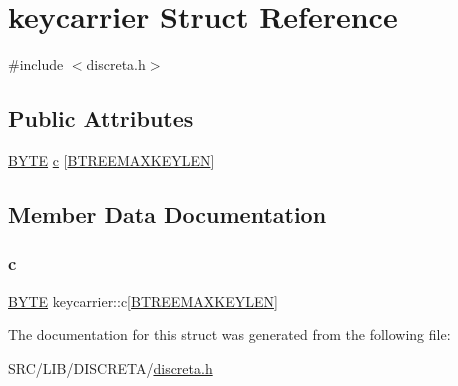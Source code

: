 \hypertarget{structkeycarrier}{}\section{keycarrier Struct Reference}
\label{structkeycarrier}


{\ttfamily \#include $<$discreta.\+h$>$}

\subsection*{Public Attributes}
\begin{DoxyCompactItemize}
\item 
\mbox{\hyperlink{galois_8h_ab6cc7b4aeb6ea31aba2b3fbfc83ff5e6}{B\+Y\+TE}} \mbox{\hyperlink{structkeycarrier_a6459fc76e934c360c68d8e567e43b976}{c}} \mbox{[}\mbox{\hyperlink{discreta_8h_a1cb18100b4320386e3e79566ab8ece17}{B\+T\+R\+E\+E\+M\+A\+X\+K\+E\+Y\+L\+EN}}\mbox{]}
\end{DoxyCompactItemize}


\subsection{Member Data Documentation}
\mbox{\label{structkeycarrier_a6459fc76e934c360c68d8e567e43b976}} 
\subsubsection{\texorpdfstring{c}{c}}
{\footnotesize\ttfamily \mbox{\hyperlink{galois_8h_ab6cc7b4aeb6ea31aba2b3fbfc83ff5e6}{B\+Y\+TE}} keycarrier\+::c\mbox{[}\mbox{\hyperlink{discreta_8h_a1cb18100b4320386e3e79566ab8ece17}{B\+T\+R\+E\+E\+M\+A\+X\+K\+E\+Y\+L\+EN}}\mbox{]}}



The documentation for this struct was generated from the following file\+:\begin{DoxyCompactItemize}
\item 
S\+R\+C/\+L\+I\+B/\+D\+I\+S\+C\+R\+E\+T\+A/\mbox{\hyperlink{discreta_8h}{discreta.\+h}}\end{DoxyCompactItemize}
